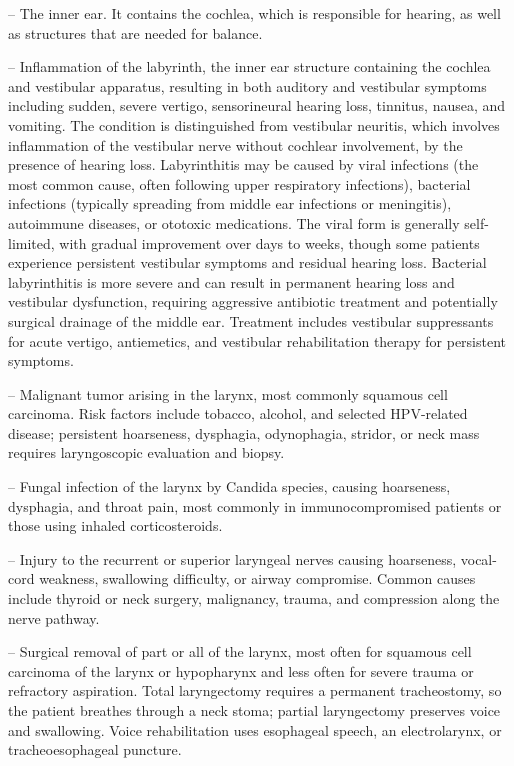 -- The inner ear. It contains the cochlea, which is responsible for hearing, as well as structures that are needed for balance.

-- Inflammation of the labyrinth, the inner ear structure containing the cochlea and vestibular apparatus, resulting in both auditory and vestibular symptoms including sudden, severe vertigo, sensorineural hearing loss, tinnitus, nausea, and vomiting. The condition is distinguished from vestibular neuritis, which involves inflammation of the vestibular nerve without cochlear involvement, by the presence of hearing loss. Labyrinthitis may be caused by viral infections (the most common cause, often following upper respiratory infections), bacterial infections (typically spreading from middle ear infections or meningitis), autoimmune diseases, or ototoxic medications. The viral form is generally self-limited, with gradual improvement over days to weeks, though some patients experience persistent vestibular symptoms and residual hearing loss. Bacterial labyrinthitis is more severe and can result in permanent hearing loss and vestibular dysfunction, requiring aggressive antibiotic treatment and potentially surgical drainage of the middle ear. Treatment includes vestibular suppressants for acute vertigo, antiemetics, and vestibular rehabilitation therapy for persistent symptoms.

-- Malignant tumor arising in the larynx, most commonly squamous cell carcinoma. Risk factors include tobacco, alcohol, and selected HPV-related disease; persistent hoarseness, dysphagia, odynophagia, stridor, or neck mass requires laryngoscopic evaluation and biopsy.

-- Fungal infection of the larynx by Candida species, causing hoarseness, dysphagia, and throat pain, most commonly in immunocompromised patients or those using inhaled corticosteroids.

-- Injury to the recurrent or superior laryngeal nerves causing hoarseness, vocal-cord weakness, swallowing difficulty, or airway compromise. Common causes include thyroid or neck surgery, malignancy, trauma, and compression along the nerve pathway.

-- Surgical removal of part or all of the larynx, most often for squamous cell carcinoma of the larynx or hypopharynx and less often for severe trauma or refractory aspiration. Total laryngectomy requires a permanent tracheostomy, so the patient breathes through a neck stoma; partial laryngectomy preserves voice and swallowing. Voice rehabilitation uses esophageal speech, an electrolarynx, or tracheoesophageal puncture.

